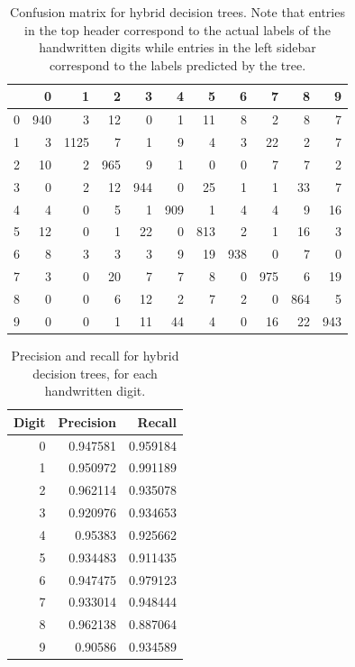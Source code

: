 \begin{table}
	\begin{tabular}{r|rrrrrrrrrr}
		&   0 &    1 &   2 &   3 &   4 &   5 &   6 &   7 &   8 &   9 \\
		\hline
		0 & 940 &    3 &  12 &   0 &   1 &  11 &   8 &   2 &   8 &   7 \\
		1 &   3 & 1125 &   7 &   1 &   9 &   4 &   3 &  22 &   2 &   7 \\
		2 &  10 &    2 & 965 &   9 &   1 &   0 &   0 &   7 &   7 &   2 \\
		3 &   0 &    2 &  12 & 944 &   0 &  25 &   1 &   1 &  33 &   7 \\
		4 &   4 &    0 &   5 &   1 & 909 &   1 &   4 &   4 &   9 &  16 \\
		5 &  12 &    0 &   1 &  22 &   0 & 813 &   2 &   1 &  16 &   3 \\
		6 &   8 &    3 &   3 &   3 &   9 &  19 & 938 &   0 &   7 &   0 \\
		7 &   3 &    0 &  20 &   7 &   7 &   8 &   0 & 975 &   6 &  19 \\
		8 &   0 &    0 &   6 &  12 &   2 &   7 &   2 &   0 & 864 &   5 \\
		9 &   0 &    0 &   1 &  11 &  44 &   4 &   0 &  16 &  22 & 943 \\
	\end{tabular}
	\caption{Confusion matrix for hybrid decision trees.  Note that entries in the top header correspond to the actual labels of the handwritten digits while entries in the left sidebar correspond to the labels predicted by the tree.}
	\label{table:with_kd_confusion}
\end{table}

\begin{table}
	\centering
	\begin{tabular}{rrr}
		Digit &   Precision &   Recall \\
		\hline
		0 &    0.947581 & 0.959184 \\
		1 &    0.950972 & 0.991189 \\
		2 &    0.962114 & 0.935078 \\
		3 &    0.920976 & 0.934653 \\
		4 &    0.95383  & 0.925662 \\
		5 &    0.934483 & 0.911435 \\
		6 &    0.947475 & 0.979123 \\
		7 &    0.933014 & 0.948444 \\
		8 &    0.962138 & 0.887064 \\
		9 &    0.90586  & 0.934589 \\
	\end{tabular}
	\caption{Precision and recall for hybrid decision trees, for each handwritten digit.}
	\label{table:with_kd_precision_recall}
\end{table}

